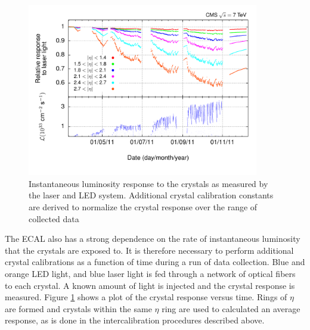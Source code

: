 \begin{figure}[h]
   \centering
  \includegraphics[width=0.9\textwidth]{Figures/Reconstruction_Diagrams/ECAL_inst_lumi_laser_calibration.pdf}
  \caption{Instantaneous luminosity response to the crystals as measured
    by the laser and LED system.  Additional crystal calibration
    constants are derived to normalize the crystal response over the
    range of collected data \cite{CMS:ECAL_ledPulsing}} \label{fig:ecal_laser}
\end{figure}

\par The ECAL also has a strong dependence on the rate of
instantaneous luminosity that the crystals are exposed to.  It is
therefore necessary to perform additional crystal calibrations as a
function of time during a run of data collection.  Blue and orange
LED light, and blue laser light is fed through a network of optical
fibers to each crystal.  A known amount of light is injected and the
crystal response is measured.  Figure \ref{fig:ecal_laser} shows a
plot of the crystal response versus time.  Rings of $\eta$ are formed
and crystals within the same $\eta$ ring are used to calculated an
average response, as is done in the intercalibration procedures
described above.   

